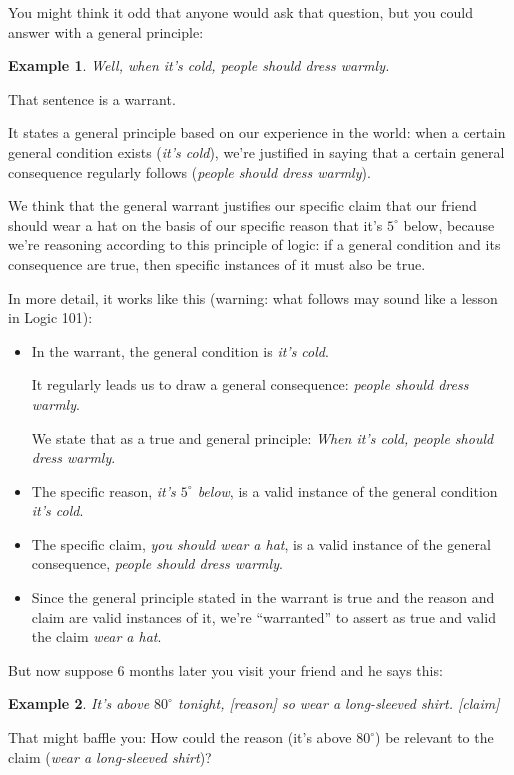 \documentclass[oneside]{book}
\numberwithin{equation}{section}
\newtheorem{example}{Example}[section]
\begin{document}
You might think it odd that anyone would ask that question, but you could answer with a general principle:
\begin{example}
    Well, when it's cold, people should dress warmly.
\end{example}
That sentence is a warrant.

It states a general principle based on our experience in the world: when a certain general condition exists (\textit{it's cold}), we're justified in saying that a certain general consequence regularly follows (\textit{people should dress warmly}).

We think that the general warrant justifies our specific claim that our friend should wear a hat on the basis of our specific reason that it's $5^\circ$ below, because we're reasoning according to this principle of logic: if a general condition and its consequence are true, then specific instances of it must also be true.

%
In more detail, it works like this (warning: what follows may sound like a lesson in Logic 101):
\begin{itemize}
    \item In the warrant, the general condition is \textit{it's cold}.
    
    It regularly leads us to draw a general consequence: \textit{people should dress warmly}.
    
    We state that as a true and general principle: \textit{When it's cold, people should dress warmly}.
    \item The specific reason, \textit{it's $5^\circ$ below}, is a valid instance of the general condition \textit{it's cold}.
    \item The specific claim, \textit{you should wear a hat}, is a valid instance of the general consequence, \textit{people should dress warmly}.
    \item Since the general principle stated in the warrant is true and the reason and claim are valid instances of it, we're ``warranted'' to assert as true and valid the claim \textit{wear a hat}.
\end{itemize}
But now suppose 6 months later you visit your friend and he says this:
\begin{example}
    It's above $80^\circ$ tonight, \emph{[reason]} so wear a long-sleeved shirt. \emph{[claim]}
\end{example}
That might baffle you: How could the reason (it's above $80^\circ$) be relevant to the claim (\textit{wear a long-sleeved shirt})?
\end{document}
